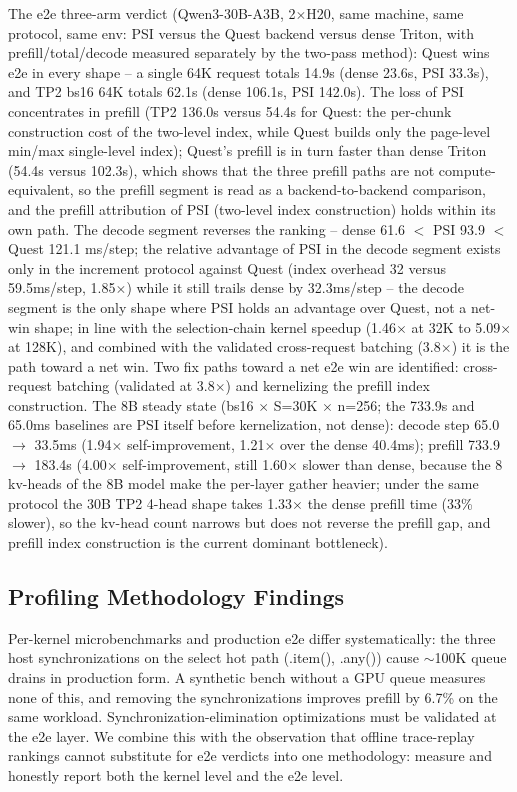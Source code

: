 \documentclass[11pt]{article}
\begin{document}
The e2e three-arm verdict (Qwen3-30B-A3B, 2$\times$H20, same machine, same protocol, same env: PSI versus the Quest backend versus dense Triton, with prefill/total/decode measured separately by the two-pass method): Quest wins e2e in every shape -- a single 64K request totals 14.9s (dense 23.6s, PSI 33.3s), and TP2 bs16 64K totals 62.1s (dense 106.1s, PSI 142.0s). The loss of PSI concentrates in prefill (TP2 136.0s versus 54.4s for Quest: the per-chunk construction cost of the two-level index, while Quest builds only the page-level min/max single-level index); Quest's prefill is in turn faster than dense Triton (54.4s versus 102.3s), which shows that the three prefill paths are not compute-equivalent, so the prefill segment is read as a backend-to-backend comparison, and the prefill attribution of PSI (two-level index construction) holds within its own path. The decode segment reverses the ranking -- dense 61.6 $<$ PSI 93.9 $<$ Quest 121.1 ms/step; the relative advantage of PSI in the decode segment exists only in the increment protocol against Quest (index overhead 32 versus 59.5ms/step, 1.85$\times$) while it still trails dense by 32.3ms/step -- the decode segment is the only shape where PSI holds an advantage over Quest, not a net-win shape; in line with the selection-chain kernel speedup (1.46$\times$ at 32K to 5.09$\times$ at 128K), and combined with the validated cross-request batching (3.8$\times$) it is the path toward a net win. Two fix paths toward a net e2e win are identified: cross-request batching (validated at 3.8$\times$) and kernelizing the prefill index construction. The 8B steady state (bs16 $\times$ S=30K $\times$ n=256; the 733.9s and 65.0ms baselines are PSI itself before kernelization, not dense): decode step 65.0 $\rightarrow$ 33.5ms (1.94$\times$ self-improvement, 1.21$\times$ over the dense 40.4ms); prefill 733.9 $\rightarrow$ 183.4s (4.00$\times$ self-improvement, still 1.60$\times$ slower than dense, because the 8 kv-heads of the 8B model make the per-layer gather heavier; under the same protocol the 30B TP2 4-head shape takes 1.33$\times$ the dense prefill time (33\% slower), so the kv-head count narrows but does not reverse the prefill gap, and prefill index construction is the current dominant bottleneck).

\subsection{Profiling Methodology Findings}

Per-kernel microbenchmarks and production e2e differ systematically: the three host synchronizations on the select hot path (.item(), .any()) cause $\sim$100K queue drains in production form. A synthetic bench without a GPU queue measures none of this, and removing the synchronizations improves prefill by 6.7\% on the same workload. Synchronization-elimination optimizations must be validated at the e2e layer. We combine this with the observation that offline trace-replay rankings cannot substitute for e2e verdicts into one methodology: measure and honestly report both the kernel level and the e2e level.
\end{document}
